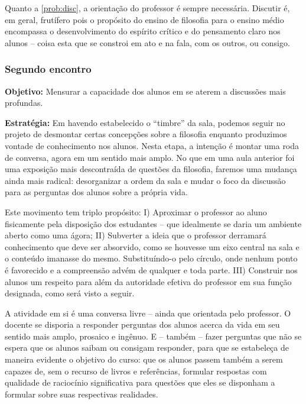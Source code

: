 \documentclass[12pt,a4paper]{article}
\begin{document}
	Quanto a \ref{prob:disc}, a orientação do professor é sempre
	necessária. Discutir é, em geral, frutífero pois o propósito
	do ensino de filosofia para o ensino médio encompassa o 
	desenvolvimento do espírito crítico e do pensamento claro nos 
	alunos -- coisa esta que se constroi em ato e na fala, com os 
	outros, ou consigo.

	\subsubsection{Segundo encontro}

	\textbf{Objetivo:} Mensurar a capacidade dos alunos em se 
	aterem a discussões mais profundas. 

	\textbf{Estratégia:}
	Em havendo estabelecido o “timbre” da sala, podemos seguir no 
	projeto de desmontar certas concepções sobre a filosofia 
	enquanto produzimos vontade de conhecimento nos alunos. Nesta
	etapa, a intenção é montar uma roda de conversa, agora 
	em um sentido mais amplo. No que em uma aula anterior foi uma 
	exposição mais descontraída de questões da filosofia, faremos 
	uma mudança ainda mais radical: desorganizar a ordem da sala e 
	mudar o foco da discussão para as perguntas dos alunos sobre 
	a própria vida. 

	Este movimento tem triplo propósito: I) Aproximar o 
	professor ao aluno fisicamente pela disposição dos 
	estudantes -- que idealmente se daria um ambiente aberto como 
	uma ágora; II) Subverter a ideia que o professor 
	derramará conhecimento que deve ser absorvido, como se houvesse
	um eixo central na sala e o conteúdo imanasse do mesmo. 
	Substituíndo-o pelo círculo, onde nenhum ponto é favorecido e 
	a compreensão advém de qualquer e toda parte. III) 
	Construir nos alunos um respeito para além da autoridade efetiva
	do professor em sua função designada, como será visto a seguir.

	A atividade em si é uma conversa livre -- ainda que orientada 
	pelo professor. O docente se disporia a responder perguntas dos 
	alunos acerca da vida em seu sentido mais amplo, prosaico e 
	ingênuo. E -- também -- fazer perguntas que não se espera que 
	os alunos saibam ou consigam responder, para que se estabeleça 
	de maneira evidente o objetivo do curso: que os alunos passem 
	também a serem capazes de, sem o recurso de livros e referências,
	formular respostas com qualidade de raciocínio significativa 
	para questões que eles se disponham a formular sobre suas 
	respectivas realidades.
	
\end{document}
